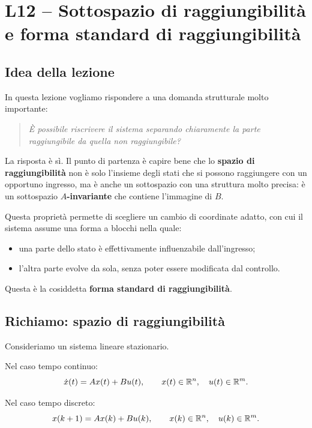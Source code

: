 \chapter{L12 -- Sottospazio di raggiungibilità e forma standard di raggiungibilità}

\section{Idea della lezione}

In questa lezione vogliamo rispondere a una domanda strutturale molto importante:

\begin{quote}
\emph{È possibile riscrivere il sistema separando chiaramente la parte raggiungibile da quella non raggiungibile?}
\end{quote}

La risposta è sì.  
Il punto di partenza è capire bene che lo \textbf{spazio di raggiungibilità} non è solo l’insieme degli stati che si possono raggiungere con un opportuno ingresso, ma è anche un sottospazio con una struttura molto precisa: è un sottospazio \textbf{\(A\)-invariante} che contiene l’immagine di \(B\).

Questa proprietà permette di scegliere un cambio di coordinate adatto, con cui il sistema assume una forma a blocchi nella quale:
\begin{itemize}
    \item una parte dello stato è effettivamente influenzabile dall’ingresso;
    \item l’altra parte evolve da sola, senza poter essere modificata dal controllo.
\end{itemize}

Questa è la cosiddetta \textbf{forma standard di raggiungibilità}.

\section{Richiamo: spazio di raggiungibilità}

Consideriamo un sistema lineare stazionario.

Nel caso tempo continuo:
\begin{equation}
\dot x(t)=Ax(t)+Bu(t),
\qquad x(t)\in\mathbb{R}^n,\quad u(t)\in\mathbb{R}^m.
\end{equation}

Nel caso tempo discreto:
\begin{equation}
x(k+1)=Ax(k)+Bu(k),
\qquad x(k)\in\mathbb{R}^n,\quad u(k)\in\mathbb{R}^m.
\end{equation}

